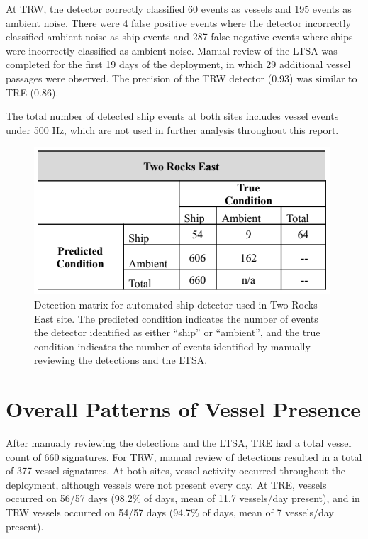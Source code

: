 \documentclass[
  letterpaper,
  oneside,
  open=any]{scrbook}
\begin{document}
At TRW, the detector correctly classified 60 events as vessels and 195
events as ambient noise. There were 4 false positive events where the
detector incorrectly classified ambient noise as ship events and 287
false negative events where ships were incorrectly classified as ambient
noise. Manual review of the LTSA was completed for the first 19 days of
the deployment, in which 29 additional vessel passages were observed.
The precision of the TRW detector (0.93) was similar to TRE (0.86).

The total number of detected ship events at both sites includes vessel
events under 500 Hz, which are not used in further analysis throughout
this report.

\begin{figure}[H]

{\centering \includegraphics{images/Table.2.PNG}

}

\caption{Detection matrix for automated ship detector used in Two Rocks
East site. The predicted condition indicates the number of events the
detector identified as either ``ship'' or ``ambient'', and the true
condition indicates the number of events identified by manually
reviewing the detections and the LTSA.}

\end{figure}%

\section{Overall Patterns of Vessel
Presence}\label{overall-patterns-of-vessel-presence}

After manually reviewing the detections and the LTSA, TRE had a total
vessel count of 660 signatures. For TRW, manual review of detections
resulted in a total of 377 vessel signatures. At both sites, vessel
activity occurred throughout the deployment, although vessels were not
present every day. At TRE, vessels occurred on 56/57 days (98.2\% of
days, mean of 11.7 vessels/day present), and in TRW vessels occurred on
54/57 days (94.7\% of days, mean of 7 vessels/day present).
\end{document}
